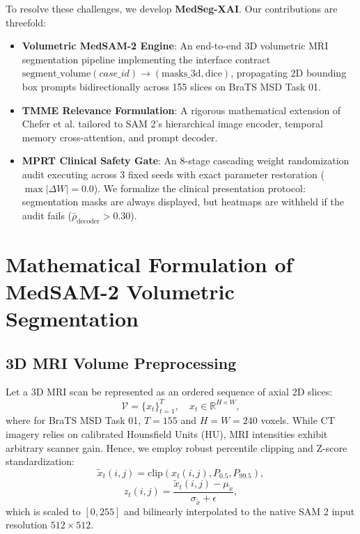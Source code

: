 \documentclass[journal,10pt,twocolumn]{IEEEtran}
\begin{document}
To resolve these challenges, we develop \textbf{MedSeg-XAI}. Our contributions are threefold:
\begin{itemize}
    \item \textbf{Volumetric MedSAM-2 Engine}: An end-to-end 3D volumetric MRI segmentation pipeline implementing the interface contract $\text{segment\_volume}(case\_id) \to (\text{masks\_3d}, \text{dice})$, propagating 2D bounding box prompts bidirectionally across 155 slices on BraTS MSD Task 01.
    \item \textbf{TMME Relevance Formulation}: A rigorous mathematical extension of Chefer et al. \cite{chefer2021transformer} tailored to SAM 2's hierarchical image encoder, temporal memory cross-attention, and prompt decoder.
    \item \textbf{MPRT Clinical Safety Gate}: An 8-stage cascading weight randomization audit executing across 3 fixed seeds with exact parameter restoration ($\max |\Delta W| = 0.0$). We formalize the clinical presentation protocol: segmentation masks are always displayed, but heatmaps are withheld if the audit fails ($\bar{\rho}_{\text{decoder}} > 0.30$).
\end{itemize}

\section{Mathematical Formulation of MedSAM-2 Volumetric Segmentation}
\label{sec:segmentation}

\subsection{3D MRI Volume Preprocessing}
Let a 3D MRI scan be represented as an ordered sequence of axial 2D slices:
\begin{equation}
    \mathcal{V} = \{ x_t \}_{t=1}^T, \quad x_t \in \mathbb{R}^{H \times W},
\end{equation}
where for BraTS MSD Task 01, $T = 155$ and $H = W = 240$ voxels. While CT imagery relies on calibrated Hounsfield Units (HU), MRI intensities exhibit arbitrary scanner gain. Hence, we employ robust percentile clipping and Z-score standardization:
\begin{equation}
    \tilde{x}_t(i, j) = \text{clip}\left( x_t(i, j), P_{0.5}, P_{99.5} \right),
\end{equation}
\begin{equation}
    z_t(i, j) = \frac{\tilde{x}_t(i, j) - \mu_{\tilde{x}}}{\sigma_{\tilde{x}} + \epsilon},
\end{equation}
which is scaled to $[0, 255]$ and bilinearly interpolated to the native SAM 2 input resolution $512 \times 512$.
\end{document}
